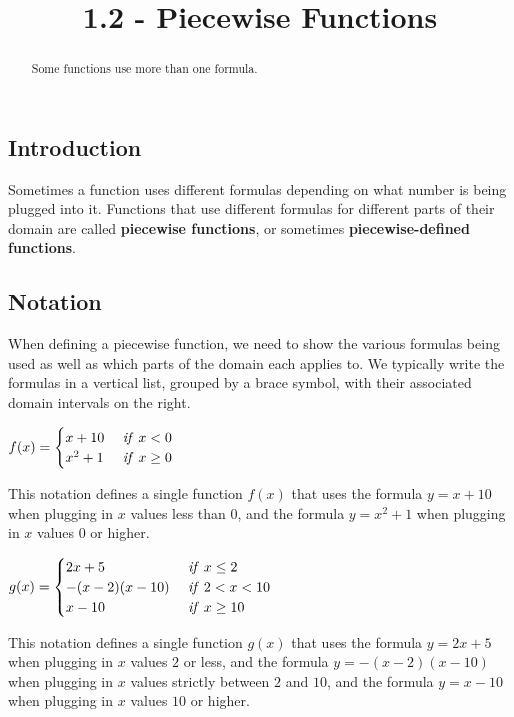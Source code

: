 \documentclass{ximera}
\title{1.2 - Piecewise Functions}
\begin{document}
\begin{abstract}
  Some functions use more than one formula.
\end{abstract}
\maketitle

\subsection*{Introduction}
Sometimes a function uses different formulas depending on what number is being plugged into it. Functions that use different formulas for different parts of their domain are called \textbf{piecewise functions}, or sometimes \textbf{piecewise-defined functions}.

\subsection*{Notation}
When defining a piecewise function, we need to show the various formulas being used as well as which parts of the domain each applies to. We typically write the formulas in a vertical list, grouped by a brace symbol, with their associated domain intervals on the right.

\begin{example}
$f(x)=\begin{cases} x+10 &  \mbox{ \emph{if} } x<0\\x^2+1 &  \mbox{ \emph{if} } x\geq 0\end{cases}$

This notation defines a single function $f(x)$ that uses the formula $y=x+10$ when plugging in $x$ values less than $0$, and the formula $y=x^2+1$ when plugging in $x$ values $0$ or higher.
\end{example}

\begin{example}
$g(x)=\begin{cases} 2x+5 & \mbox{ \emph{if} }x\leq 2\\ -(x-2)(x-10) & \mbox{ \emph{if} } 2<x<10\\ x-10 & \mbox{ \emph{if} } x\geq 10\end{cases}$

This notation defines a single function $g(x)$ that uses the formula $y=2x+5$ when plugging in $x$ values $2$ or less, and the formula $y=-(x-2)(x-10)$ when plugging in $x$ values strictly between $2$ and $10$, and the formula $y=x-10$ when plugging in $x$ values $10$ or higher.
\end{example}
\end{document}
